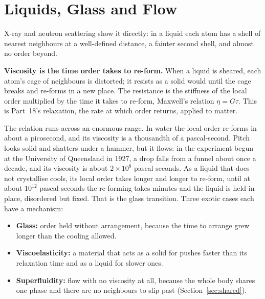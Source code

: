 \documentclass[11pt,a4paper]{article}
\begin{document}
\section{Liquids, Glass and Flow}
\label{sec:liquids}

 X-ray and neutron scattering show it directly: in a liquid each atom has a shell of nearest neighbours at a well-defined distance, a fainter second shell, and almost no order beyond.

\begin{hypbar}
\textbf{Viscosity is the time order takes to re-form.} When a liquid is sheared, each atom's cage of neighbours is distorted; it resists as a solid would until the cage breaks and re-forms in a new place. The resistance is the stiffness of the local order multiplied by the time it takes to re-form, Maxwell's relation $\eta = G\tau$. This is Part~18's relaxation, the rate at which order returns, applied to matter.
\end{hypbar}

The relation runs across an enormous range. In water the local order re-forms in about a picosecond, and its viscosity is a thousandth of a pascal-second. Pitch looks solid and shatters under a hammer, but it flows: in the experiment begun at the University of Queensland in 1927, a drop falls from a funnel about once a decade, and its viscosity is about $2\times10^{8}$ pascal-seconds.  As a liquid that does not crystallise cools, its local order takes longer and longer to re-form, until at about $10^{12}$ pascal-seconds the re-forming takes minutes and the liquid is held in place, disordered but fixed. That is the glass transition. Three exotic cases each have a mechanism:
\begin{itemize}
\item \textbf{Glass:} order held without arrangement, because the time to arrange grew longer than the cooling allowed.
\item \textbf{Viscoelasticity:} a material that acts as a solid for pushes faster than its relaxation time and as a liquid for slower ones.
\item \textbf{Superfluidity:} flow with no viscosity at all, because the whole body shares one phase and there are no neighbours to slip past (Section~\ref{sec:shared}).
\end{itemize}
\end{document}
